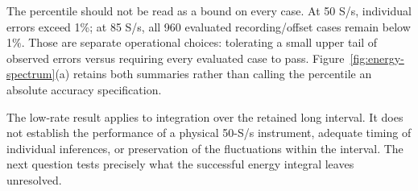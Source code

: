 The percentile should not be read as a bound on every case. At 50 S/s, individual errors exceed 1\%; at 85 S/s, all 960 evaluated recording/offset cases remain below 1\%. Those are separate operational choices: tolerating a small upper tail of observed errors versus requiring every evaluated case to pass. Figure~\ref{fig:energy-spectrum}(a) retains both summaries rather than calling the percentile an absolute accuracy specification.

The low-rate result applies to integration over the retained long interval. It does not establish the performance of a physical 50-S/s instrument, adequate timing of individual inferences, or preservation of the fluctuations within the interval. The next question tests precisely what the successful energy integral leaves unresolved.
